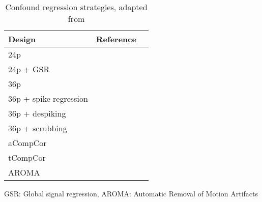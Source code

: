 \begin{table}[bt]
\begin{threeparttable}
\begin{subtable}[t]{.75\textwidth}
            \begin{tabularx}{\textwidth}{l l l}
                \toprule
                \textbf{Design}        & \textbf{Reference}                 \\
                \midrule
                24p                    & \cite{friston1996movement}         \\
                24p + GSR              & \cite{macey2004method}             \\
                36p              & \cite{satterthwaite2013improved}   \\
                36p + spike regression & \cite{cox1996afni}                 \\
                36p + despiking        & \cite{satterthwaite2013improved}   \\
                36p + scrubbing  & \cite{power2014methods}            \\
                aCompCor               & \cite{muschelli2014reduction}      \\
                tCompCor               & \cite{behzadi2007component}        \\
                AROMA                  & \cite{pruim2015ica}                \\
                \bottomrule
            \end{tabularx}
            \begin{tablenotes}
                \item GSR: Global signal regression, AROMA: Automatic Removal of Motion Artifacts
            \end{tablenotes}
            \caption{Confound regression strategies, adapted from \citep{Ciric2017-cl}}
        \end{subtable}
        \makeatletter\def\TPT@hsize{}\makeatletter
    \end{threeparttable}
    \label{tab:multiverse}
\end{table}